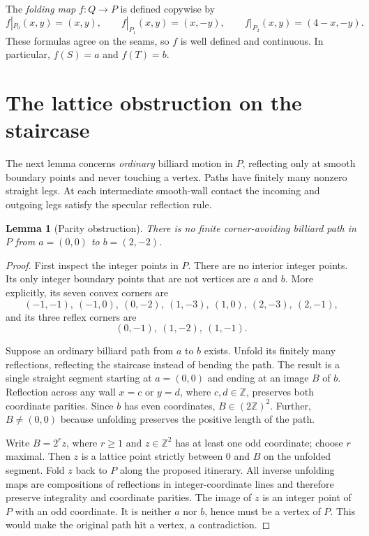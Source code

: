 \documentclass[11pt]{article}
\newtheorem{lemma}{Lemma}
\theoremstyle{remark}
\begin{document}
The \emph{folding map} $f:Q\to P$ is defined copywise by
\begin{equation}\label{eq:fold}
f|_{P_0}(x,y)=(x,y),\qquad
f|_{P_1}(x,y)=(x,-y),\qquad
f|_{P_2}(x,y)=(4-x,-y).
\end{equation}
These formulas agree on the seams, so $f$ is well defined and continuous. In particular, $f(S)=a$ and $f(T)=b$.

\section{The lattice obstruction on the staircase}
The next lemma concerns \emph{ordinary} billiard motion in $P$, reflecting only at smooth boundary points and never touching a vertex. Paths have finitely many nonzero straight legs. At each intermediate smooth-wall contact the incoming and outgoing legs satisfy the specular reflection rule.

\begin{lemma}[Parity obstruction]\label{lem:parity}
There is no finite corner-avoiding billiard path in $P$ from $a=(0,0)$ to $b=(2,-2)$.
\end{lemma}
\begin{proof}
First inspect the integer points in $P$. There are no interior integer points. Its only integer boundary points that are not vertices are $a$ and $b$. More explicitly, its seven convex corners are
\[
(-1,-1),\ (-1,0),\ (0,-2),\ (1,-3),\ (1,0),\ (2,-3),\ (2,-1),
\]
and its three reflex corners are
\[
(0,-1),\ (1,-2),\ (1,-1).
\]

Suppose an ordinary billiard path from $a$ to $b$ exists. Unfold its finitely many reflections, reflecting the staircase instead of bending the path. The result is a single straight segment starting at $a=(0,0)$ and ending at an image $B$ of $b$. Reflection across any wall $x=c$ or $y=d$, where $c,d\in\mathbb{Z}$, preserves both coordinate parities. Since $b$ has even coordinates, $B\in(2\mathbb{Z})^2$. Further, $B\ne(0,0)$ because unfolding preserves the positive length of the path.

Write $B=2^r z$, where $r\ge 1$ and $z\in\mathbb{Z}^2$ has at least one odd coordinate; choose $r$ maximal. Then $z$ is a lattice point strictly between $0$ and $B$ on the unfolded segment. Fold $z$ back to $P$ along the proposed itinerary. All inverse unfolding maps are compositions of reflections in integer-coordinate lines and therefore preserve integrality and coordinate parities. The image of $z$ is an integer point of $P$ with an odd coordinate. It is neither $a$ nor $b$, hence must be a vertex of $P$. This would make the original path hit a vertex, a contradiction.
\end{proof}
\end{document}
